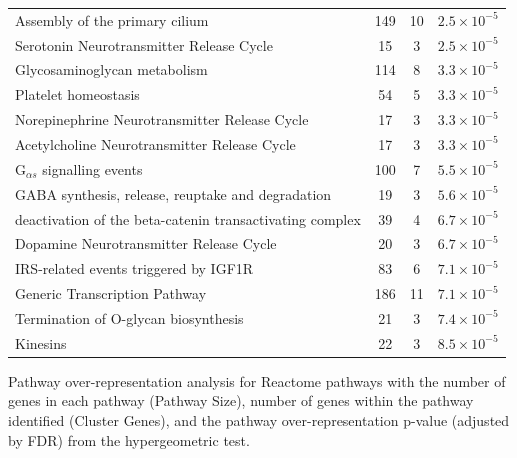 \begin{table}[!htbp]
{\begin{threeparttable}
\begin{tabular}{lccc}
  \rowcolor{Cluster_Orange!30}
  Assembly of the primary cilium & 149 &  10 & $2.5 \times 10^{-5}$ \\ 
  \rowcolor{Cluster_Orange!20}
  Serotonin Neurotransmitter Release Cycle &  15 &   3 & $2.5 \times 10^{-5}$ \\ 
  \rowcolor{Cluster_Orange!30}
  Glycosaminoglycan metabolism & 114 &   8 & $3.3 \times 10^{-5}$ \\ 
  \rowcolor{Cluster_Orange!20}
  Platelet homeostasis &  54 &   5 & $3.3 \times 10^{-5}$ \\ 
  \rowcolor{Cluster_Orange!30}
  Norepinephrine Neurotransmitter Release Cycle &  17 &   3 & $3.3 \times 10^{-5}$ \\ 
  \rowcolor{Cluster_Orange!20}
  Acetylcholine Neurotransmitter Release Cycle &  17 &   3 & $3.3 \times 10^{-5}$ \\ 
  \rowcolor{Cluster_Orange!30}
  G$_{\alpha s}$ signalling events & 100 &   7 & $5.5 \times 10^{-5}$ \\ 
  \rowcolor{Cluster_Orange!20}
  GABA synthesis, release, reuptake and degradation &  19 &   3 & $5.6 \times 10^{-5}$ \\ 
  \rowcolor{Cluster_Orange!30}
  deactivation of the beta-catenin transactivating complex &  39 &   4 & $6.7 \times 10^{-5}$ \\ 
  \rowcolor{Cluster_Orange!20}
  Dopamine Neurotransmitter Release Cycle &  20 &   3 & $6.7 \times 10^{-5}$ \\ 
  \rowcolor{Cluster_Orange!30}
  IRS-related events triggered by IGF1R &  83 &   6 & $7.1 \times 10^{-5}$ \\ 
  \rowcolor{Cluster_Orange!20}
  Generic Transcription Pathway & 186 &  11 & $7.1 \times 10^{-5}$ \\ 
  \rowcolor{Cluster_Orange!30}
  Termination of O-glycan biosynthesis &  21 &   3 & $7.4 \times 10^{-5}$ \\ 
  \rowcolor{Cluster_Orange!20}
  Kinesins &  22 &   3 & $8.5 \times 10^{-5}$ \\ 
  \hline
  \end{tabular}
\begin{tablenotes}
\raggedright %
Pathway over-representation analysis for Reactome pathways with the number of genes in each pathway (Pathway Size), number of genes within the pathway identified (Cluster Genes), and the pathway over-representation p-value (adjusted by \gls{FDR}) from the hypergeometric test.  
\end{tablenotes}
\end{threeparttable}
}
\end{table}

